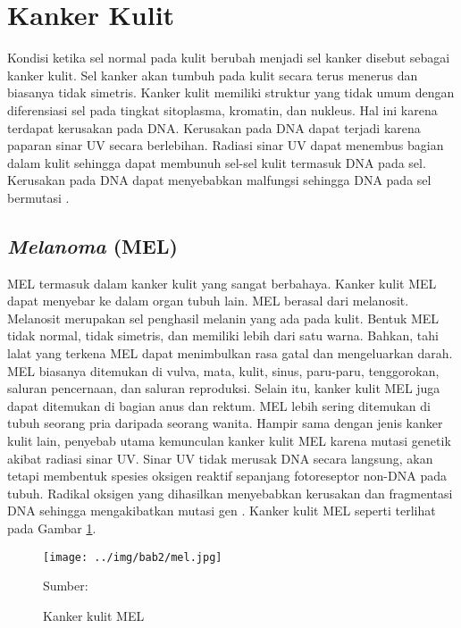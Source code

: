 \section{Kanker Kulit}
Kondisi ketika sel normal pada kulit berubah menjadi sel kanker disebut sebagai kanker kulit. Sel kanker akan tumbuh pada kulit secara terus menerus dan biasanya tidak simetris. Kanker kulit memiliki struktur yang tidak umum dengan diferensiasi sel pada tingkat sitoplasma, kromatin, dan nukleus. Hal ini karena terdapat kerusakan pada DNA. Kerusakan pada DNA dapat terjadi karena paparan sinar UV secara berlebihan. Radiasi sinar UV dapat menembus bagian dalam kulit sehingga dapat membunuh sel-sel kulit termasuk DNA pada sel. Kerusakan pada DNA dapat menyebabkan malfungsi sehingga DNA pada sel bermutasi \citep{Nugroho2019}.

    \subsection{\textit{Melanoma} (MEL)}
    MEL termasuk dalam kanker kulit yang sangat berbahaya. Kanker kulit MEL dapat menyebar ke dalam organ tubuh lain. MEL berasal dari melanosit. Melanosit merupakan sel penghasil melanin yang ada pada kulit. Bentuk MEL tidak normal, tidak simetris, dan memiliki lebih dari satu warna. Bahkan, tahi lalat yang terkena MEL dapat menimbulkan rasa gatal dan mengeluarkan darah. MEL biasanya ditemukan di vulva, mata, kulit, sinus, paru-paru, tenggorokan, saluran pencernaan, dan saluran reproduksi. Selain itu, kanker kulit MEL juga dapat ditemukan di bagian anus dan rektum. MEL lebih sering ditemukan di tubuh seorang pria daripada seorang wanita. Hampir sama dengan jenis kanker kulit lain, penyebab utama kemunculan kanker kulit MEL karena mutasi genetik akibat radiasi sinar UV. Sinar UV tidak merusak DNA secara langsung, akan tetapi membentuk spesies oksigen reaktif sepanjang fotoreseptor non-DNA pada tubuh. Radikal oksigen yang dihasilkan menyebabkan kerusakan dan fragmentasi DNA sehingga mengakibatkan mutasi gen \citep{Sang2019}. Kanker kulit MEL seperti terlihat pada Gambar \ref{fig:mel}.
    \begin{figure}[H] 
        \begin{center} 
            \texttt{[image: ../img/bab2/mel.jpg]}
            \caption{Kanker kulit MEL} 
            \label{fig:mel}
            Sumber: \citep{Codella2018,Combalia2019,Tschandl2018}
        \end{center} 
    \end{figure}

